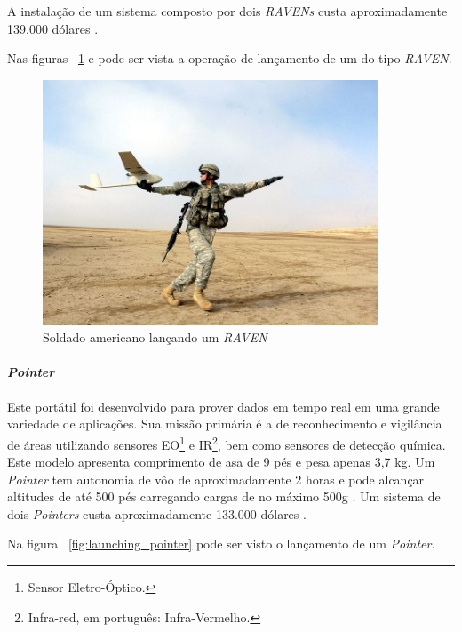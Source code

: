 A instalação de um sistema composto por dois \emph{RAVENs} custa aproximadamente 139.000 dólares \cite{Drew2005}. 

Nas figuras ~\ref{fig:raven} e  pode ser vista a operação de lançamento de um \vant do tipo \emph{RAVEN}.

\begin{figure}[h!]
\centering
\includegraphics[width=10cm]{pictures/launching_raven.jpg}
\caption{Soldado americano lançando um \emph{RAVEN} }
 \label{fig:raven}
\end{figure}




\paragraph{ \emph{Pointer}}
Este \vant  portátil foi desenvolvido para prover dados em tempo real em uma grande variedade de aplicações. Sua missão primária é a de reconhecimento e vigilância de áreas
utilizando sensores EO\footnote{Sensor Eletro-Óptico.} e IR\footnote{Infra-red, em português: Infra-Vermelho.}, bem como sensores de detecção química. Este modelo apresenta comprimento de asa de 9 pés e pesa apenas 3,7 kg. Um \emph{Pointer} tem autonomia de vôo de aproximadamente 2 horas e pode alcançar altitudes de até 500 pés carregando cargas de no máximo 500g \cite{uas_2009}. Um sistema de dois \emph{Pointers} custa aproximadamente 133.000 dólares \cite{Bone2003}. 

Na figura ~\ref{fig:launching_pointer} pode ser visto o lançamento de um \emph{Pointer}. 

